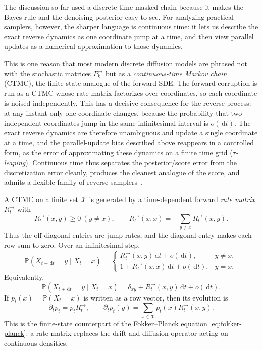 \documentclass[10pt,a4paper]{amsart}
\numberwithin{equation}{section}
\newcommand{\Pp}{\mathbb{P}}
\newcommand{\dd}{\,\mathrm{d}}
\newcommand{\cX}{\mathcal{X}}
\begin{document}
The discussion so far used a discrete-time masked chain because it makes the
Bayes rule and the denoising posterior easy to see.  For analyzing practical
samplers, however, the sharper language is continuous time: it lets us describe
the exact reverse dynamics as one coordinate jump at a time, and then view
parallel updates as a numerical approximation to those dynamics.

This is one reason that most modern discrete diffusion models are phrased not with
the stochastic matrices $P_k^{\to}$ but as a \emph{continuous-time Markov chain}
(CTMC), the finite-state analogue of the forward SDE\@.  The forward corruption is
run as a CTMC whose rate matrix factorizes over coordinates, so each coordinate
is noised independently.  This has a decisive consequence for the reverse
process: at any instant only one coordinate changes, because the probability
that two independent coordinates jump in the same infinitesimal interval is
$o(\dd t)$.  The exact reverse dynamics are therefore unambiguous and update a single
coordinate at a time, and the parallel-update bias described above
reappears in a controlled form, as the error of approximating these dynamics on
a finite time grid (\emph{$\tau$-leaping}).  Continuous time thus separates the
posterior/score error from the discretization error cleanly, produces the
cleanest analogue of the score, and admits a flexible family of reverse
samplers~\cite{campbell2022continuous,lou2024sedd}.

A CTMC on a finite set $\cX$ is generated by a time-dependent forward
\emph{rate matrix} $R_t^{\to}$ with
\[
    R_t^{\to}(x,y)\geq0\ (y\neq x),
    \qquad
    R_t^{\to}(x,x)=-\sum_{y\neq x}R_t^{\to}(x,y).
\]
Thus the off-diagonal entries are jump rates, and the diagonal entry makes each
row sum to zero.  Over an infinitesimal step,
\[
    \Pp(X_{t+\dd t}=y\mid X_t=x)
    =
    \begin{cases}
    R_t^{\to}(x,y)\dd t+o(\dd t), & y\neq x,\\
    1+R_t^{\to}(x,x)\dd t+o(\dd t), & y=x.
    \end{cases}
\]
Equivalently,
\[
    \Pp(X_{t+\dd t}=y\mid X_t=x)
    =
    \delta_{xy}+R_t^{\to}(x,y)\dd t+o(\dd t).
\]
If $p_t(x)=\Pp(X_t=x)$ is written as a row vector, then its evolution is
\begin{equation}\label{eq:ctmc-forward-equation}
    \partial_t p_t=p_tR_t^{\to},
    \qquad
    \partial_t p_t(y)=\sum_{x\in\cX}p_t(x)R_t^{\to}(x,y).
\end{equation}
This is the finite-state counterpart of the Fokker--Planck equation
\eqref{eq:fokker-planck}: a rate matrix replaces the drift-and-diffusion
operator acting on continuous densities.
\end{document}
